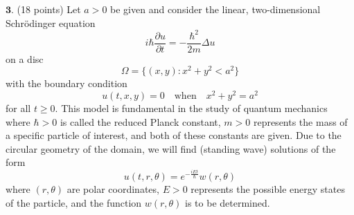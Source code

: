 \documentclass[12pt]{article}
\begin{document}
\noindent $\textbf{3}$. (18 points) Let $a > 0$ be given and consider the linear, two-dimensional Schr\"{o}dinger equation
\begin{equation}
\label{SE}
i\hbar \frac{\partial u}{\partial t} = - \frac{\hbar^2}{2m} \Delta u
\end{equation}
on a disc
$$\Omega = \{ (x,y) : x^2 + y^2 < a^2 \}$$
with the boundary condition
$$u(t,x,y) = 0 \quad \mathrm{when} \quad x^2 + y^2 = a^2$$
for all $t \geq 0$.
This model is fundamental in the study of quantum mechanics where $\hbar > 0$ is called the reduced Planck constant, $m > 0$ represents the mass of a specific particle of interest, and both of these constants are given.
Due to the circular geometry of the domain, we will find (standing wave) solutions of the form
$$u(t,r,\theta) = e^{-\frac{iEt}{\hbar}} w(r,\theta)$$
where $(r,\theta)$ are polar coordinates, $E > 0$ represents the possible energy states of the particle, and the function $w(r,\theta)$ is to be determined.
\end{document}
